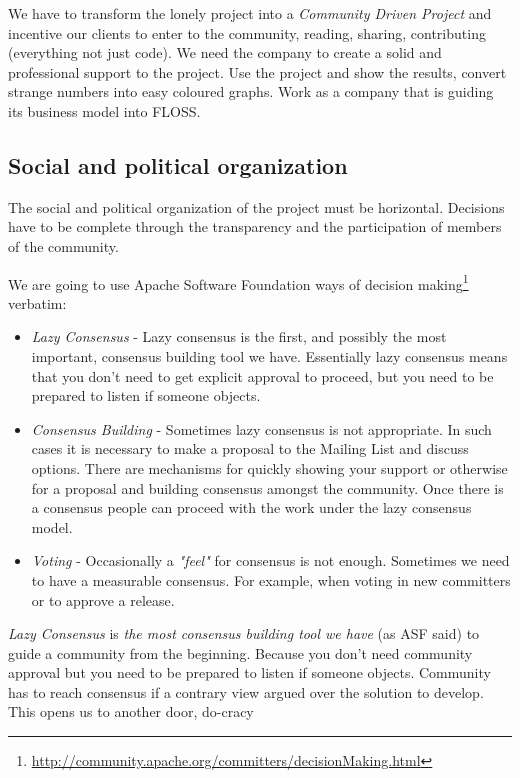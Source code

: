 \documentclass[11pt]{scrartcl}
\begin{document}
\par We have to transform the lonely project into a \emph{Community Driven Project} and incentive our clients to enter to the community, reading, sharing, contributing (everything not just code). We need the company to create a solid and professional support to the project. Use the project and show the results, convert strange numbers into easy coloured graphs. Work as a company that is guiding its business model into FLOSS.


\subsection{Social and political organization}
\label{sub:social-political}

\par The social and political organization of the project must be horizontal. Decisions have to be complete through the transparency and the participation of members of the community.

\par We are going to use Apache Software Foundation ways of decision making\footnote{\url{http://community.apache.org/committers/decisionMaking.html}} verbatim:

\begin{itemize}
	\item \emph{Lazy Consensus} - Lazy consensus is the first, and possibly the most important, consensus building tool we have. Essentially lazy consensus means that you don't need to get explicit approval to proceed, but you need to be prepared to listen if someone objects.

	\item \emph{Consensus Building} - Sometimes lazy consensus is not appropriate. In such cases it is necessary to make a proposal to the Mailing List and discuss options. There are mechanisms for quickly showing your support or otherwise for a proposal and building consensus amongst the community. Once there is a consensus people can proceed with the work under the lazy consensus model.

	\item \emph{Voting} - Occasionally a \emph{"feel"} for consensus is not enough. Sometimes we need to have a measurable consensus. For example, when voting in new committers or to approve a release.
\end{itemize}

\par \emph{Lazy Consensus} is \emph{the most consensus building tool we have} (as ASF said) to guide a community from the beginning. Because you don't need community approval but you need to be prepared to listen if someone objects. Community has to reach consensus if a contrary view argued over the solution to develop. This opens us to another door, do-cracy 
\end{document}
